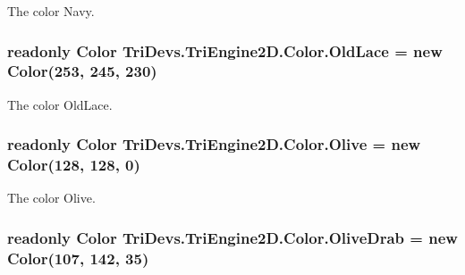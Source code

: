 The color Navy. 

\hypertarget{struct_tri_devs_1_1_tri_engine2_d_1_1_color_a9ce008e65869f8b4f76504bc1e1bb0ab}{
\subsubsection[{Old\-Lace}]{\setlength{\rightskip}{0pt plus 5cm}readonly {\bf Color} Tri\-Devs.\-Tri\-Engine2\-D.\-Color.\-Old\-Lace = new {\bf Color}(253, 245, 230)\hspace{0.3cm}{\ttfamily [static]}}}\label{struct_tri_devs_1_1_tri_engine2_d_1_1_color_a9ce008e65869f8b4f76504bc1e1bb0ab}


The color Old\-Lace. 

\hypertarget{struct_tri_devs_1_1_tri_engine2_d_1_1_color_ae875f246fd344421d8fd127f31e3845c}{
\subsubsection[{Olive}]{\setlength{\rightskip}{0pt plus 5cm}readonly {\bf Color} Tri\-Devs.\-Tri\-Engine2\-D.\-Color.\-Olive = new {\bf Color}(128, 128, 0)\hspace{0.3cm}{\ttfamily [static]}}}\label{struct_tri_devs_1_1_tri_engine2_d_1_1_color_ae875f246fd344421d8fd127f31e3845c}


The color Olive. 

\hypertarget{struct_tri_devs_1_1_tri_engine2_d_1_1_color_a95ee64af9429d0facfa6e0841ac3535d}{
\subsubsection[{Olive\-Drab}]{\setlength{\rightskip}{0pt plus 5cm}readonly {\bf Color} Tri\-Devs.\-Tri\-Engine2\-D.\-Color.\-Olive\-Drab = new {\bf Color}(107, 142, 35)\hspace{0.3cm}{\ttfamily [static]}}}\label{struct_tri_devs_1_1_tri_engine2_d_1_1_color_a95ee64af9429d0facfa6e0841ac3535d}


